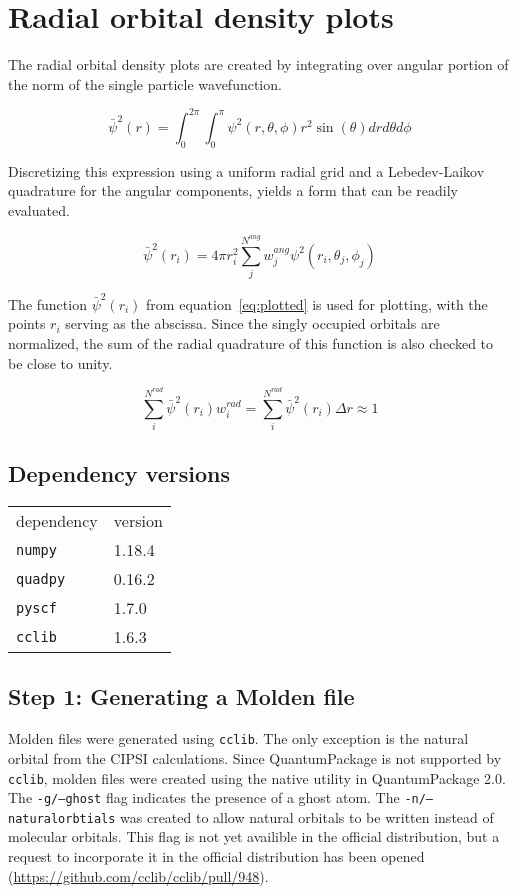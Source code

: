 \section{Radial orbital density plots}
The radial orbital density plots are created by integrating over angular portion of the norm of the single particle wavefunction.

\begin{equation}
    \bar{\psi}^2(r) = \int_0^{2\pi}\int_0^{\pi} \psi^2(r,\theta,\phi) r^2 \sin(\theta) dr d\theta d\phi
\end{equation}

Discretizing this expression using a uniform radial grid and a Lebedev-Laikov quadrature for the angular components, yields a form that can be readily evaluated.

\begin{equation}\label{eq:plotted}
    \bar{\psi}^2(r_i) = 4 \pi {r_i^2}  \sum_j^{N^{ang}} w^{ang}_j \psi^2(r_i,\theta_j,\phi_j) 
\end{equation}

The function $\bar{\psi}^2(r_i)$ from equation~\ref{eq:plotted} is used for plotting, with the points $r_i$ serving as the abscissa.
Since the singly occupied orbitals are normalized, the sum of the radial quadrature of this function is also checked to be close to unity.

\begin{equation}\label{eq:norm}
    \sum_i^{N^{rad}} \bar{\psi}^2(r_i) w^{rad}_i = \sum_i^{N^{rad}} \bar{\psi}^2(r_i) {\Delta}r \approx  1
\end{equation}

\subsection{Dependency versions}
\begin{table}[]
\begin{tabular}{ll}
dependency      & version     \\
\texttt{numpy}  & 1.18.4      \\
\texttt{quadpy} & 0.16.2      \\
\texttt{pyscf}  & 1.7.0       \\
\texttt{cclib}  & 1.6.3       \\
\end{tabular}   
\end{table}


\subsection{Step 1: Generating a Molden file}
Molden files were generated using \texttt{cclib}. 
The only exception is the natural orbital from the CIPSI calculations. 
Since QuantumPackage is not supported by \texttt{cclib}, molden files were created using the native utility in QuantumPackage 2.0. 
The \texttt{-g/--ghost} flag indicates the presence of a ghost atom.
The \texttt{-n/--naturalorbtials} was created to allow natural orbitals to be written instead of molecular orbitals.
This flag is not yet availible in the official distribution, but a request to incorporate it in the official distribution has been opened (\url{https://github.com/cclib/cclib/pull/948}).

